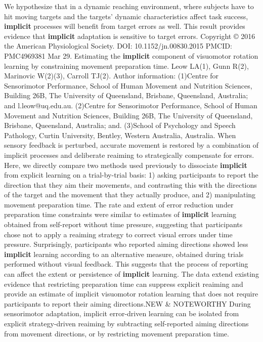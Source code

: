 \documentclass[11pt]{article}
\begin{document}
\newline  [  98  ]   We hypothesize that in a dynamic reaching environment, where subjects  have to hit moving targets and the targets' dynamic characteristics affect task  success,   \textbf {  implicit  }   processes will benefit from target errors as well.
\newline  [  99  ]   This  result provides evidence that   \textbf {  implicit  }   adaptation is sensitive to target errors.  Copyright © 2016 the American Physiological Society.  DOI: 10.1152/jn.00830.2015 PMCID: PMC4969381
\newline  [  100  ]  Mar 29.  Estimating the   \textbf {  implicit  }   component of visuomotor rotation learning by  constraining movement preparation time.  Leow LA(1), Gunn R(2), Marinovic W(2)(3), Carroll TJ(2).  Author information: (1)Centre for Sensorimotor Performance, School of Human Movement and Nutrition  Sciences, Building 26B, The University of Queensland, Brisbane, Queensland,  Australia; and l.leow@uq.edu.au. (2)Centre for Sensorimotor Performance, School of Human Movement and Nutrition  Sciences, Building 26B, The University of Queensland, Brisbane, Queensland,  Australia; and. (3)School of Psychology and Speech Pathology, Curtin University, Bentley,  Western Australia, Australia.  When sensory feedback is perturbed, accurate movement is restored by a  combination of implicit processes and deliberate reaiming to strategically  compensate for errors.
\newline  [  101  ]   Here, we directly compare two methods used previously to  dissociate   \textbf {  implicit  }   from explicit learning on a trial-by-trial basis: 1) asking  participants to report the direction that they aim their movements, and  contrasting this with the directions of the target and the movement that they  actually produce, and 2) manipulating movement preparation time.
\newline  [  102  ]   The rate and extent of  error reduction under preparation time constraints were similar to estimates of    \textbf {  implicit  }   learning obtained from self-report without time pressure, suggesting  that participants chose not to apply a reaiming strategy to correct visual  errors under time pressure.
\newline  [  103  ]   Surprisingly, participants who reported aiming  directions showed less   \textbf {  implicit  }   learning according to an alternative measure,  obtained during trials performed without visual feedback.
\newline  [  104  ]   This suggests that the  process of reporting can affect the extent or persistence of   \textbf {  implicit  }   learning.  The data extend existing evidence that restricting preparation time can suppress  explicit reaiming and provide an estimate of implicit visuomotor rotation  learning that does not require participants to report their aiming  directions.NEW & NOTEWORTHY During sensorimotor adaptation, implicit  error-driven learning can be isolated from explicit strategy-driven reaiming by  subtracting self-reported aiming directions from movement directions, or by  restricting movement preparation time.
\end{document}
